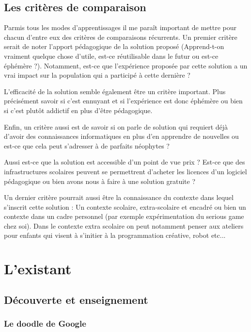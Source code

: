 \subsection{Les critères de comparaison}

Parmis tous les modes d'apprentissages il me paraît important de mettre pour chacun d'entre eux des critères de comparaisons récurrents. Un premier critère serait de noter l'apport pédagogique de la solution proposé (Apprend-t-on vraiment quelque chose d'utile, est-ce réutilisable dans le futur ou est-ce éphémère ?). Notamment, est-ce que l'expérience proposée par cette solution a un vrai impact sur la population qui a participé à cette dernière ?

L'efficacité de la solution semble également être un critère important. Plus précisément savoir si c'est ennuyant et si l'expérience est donc éphémère ou bien si c'est plutôt addictif en plus d'être pédagogique.

Enfin, un critère aussi est de savoir si on parle de solution qui requiert déjà d’avoir des connaissances informatiques en plus d’en apprendre de nouvelles ou est-ce que cela peut s’adresser à de parfaits néophytes ?

Aussi est-ce que la solution est accessible d'un point de vue prix ? Est-ce que des infrastructures scolaires peuvent se permettrent d'acheter les licences d'un logiciel pédagogique ou bien avons nous à faire à une solution gratuite ?

Un dernier critère pourrait aussi être la connaissance du contexte dans lequel s'inscrit cette solution : Un contexte scolaire, extra-scolaire et encadré ou bien un contexte dans un cadre personnel (par exemple expérimentation du serious game chez soi). Dans le contexte extra scolaire on peut notamment penser aux ateliers pour enfants qui visent à s'initier à la programmation créative, robot etc...

\section{L'existant}

\subsection{Découverte et enseignement}

\subsubsection{Le doodle de Google}

